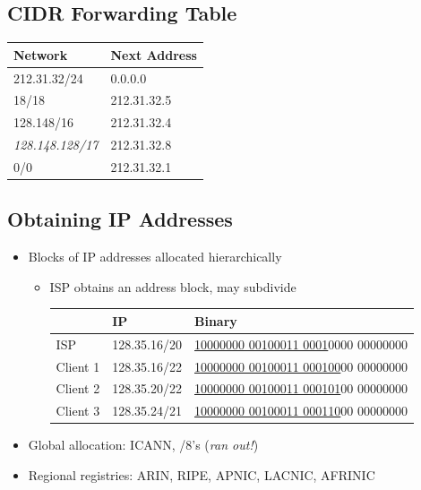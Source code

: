 \subsection{CIDR Forwarding Table}
\begin{table}[H]
    \begin{tabular}{ll}
        Network               & Next Address \\\toprule
        212.31.32/24          & 0.0.0.0      \\
        18/18                 & 212.31.32.5  \\
        128.148/16            & 212.31.32.4  \\
        \emph{128.148.128/17} & 212.31.32.8  \\
        0/0                   & 212.31.32.1
    \end{tabular}
\end{table}

\subsection{Obtaining IP Addresses}
\begin{itemize}[nosep]
    \item Blocks of IP addresses allocated hierarchically
          \begin{itemize}[nosep]
              \item ISP obtains an address block, may subdivide
                    \begin{table}[H]
                        \begin{tabular}{lll}
                                     & IP           & Binary                                          \\\toprule
                            ISP      & 128.35.16/20 & \underline{10000000 00100011 0001}0000 00000000 \\
                            Client 1 & 128.35.16/22 & \underline{10000000 00100011 000100}00 00000000 \\
                            Client 2 & 128.35.20/22 & \underline{10000000 00100011 000101}00 00000000 \\
                            Client 3 & 128.35.24/21 & \underline{10000000 00100011 000110}00 00000000 \\
                        \end{tabular}
                    \end{table}
          \end{itemize}
    \item Global allocation: ICANN, /8's (\emph{ran out!})
    \item Regional registries: ARIN, RIPE, APNIC, LACNIC, AFRINIC
\end{itemize}